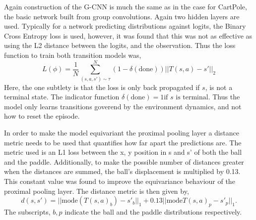 Again construction of the G-CNN is much the same as in the case for CartPole, the basic network built from group convolutions. Again two hidden layers are used. Typically for a network predicting distributions against logits, the Binary Cross Entropy loss is used, however, it was found that this was not as effective as using the L2 distance between the logits, and the observation. Thus the loss function to train both transition models was,
\begin{equation}
	L(\phi) = \frac{1}{N}\sum_{(s, a, s') \sim \tau}^N (1 - \delta(\text{done}))||T(s, a) - s'||_2 \end{equation} Here, the one subtlety is that the loss is only back propagated if $s$, is not a terminal state. The indicator function $\delta(\text{done}) = 1 \text{if $s$ is terminal} $. Thus the model only learns transitions goverend by the environment dynamics, and not how to reset the episode.

In order to make the model equivariant the proximal pooling layer a distance metric needs to be used that quantifies how far apart the predictions are. The metric used is an L1 loss between the x, y position in s and s' of both the ball and the paddle. Additionally, to make the possible number of distances greater when the distances are summed, the ball's displacement is multiplied by 0.13. This constant value was found to improve the equivariance behaviour of the proximal pooling layer. The distance metric is then given by,
\begin{equation}
	d(s, s') = ||\text{mode}(T(s, a)_b) - s'_b||_1 + 0.13 ||\text{mode}T(s, a)_p - s'_p||_1.
\end{equation}
The subscripts, $b, p$ indicate the ball and the paddle distributions respectively.

